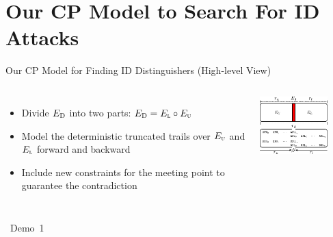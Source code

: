 \documentclass[table,aspectratio=169]{beamer}
\newcommand{\Up}{_{\textsc{u}}} %
\newcommand{\Low}{_{\textsc{l}}} %
\begin{document}
\section{Our CP Model to Search For ID Attacks}

\begin{frame}{Our CP Model for Finding ID Distinguishers (High-level View)}
\begin{columns}[onlytextwidth]
\begin{itemize}
  \item Divide $E_{\textsc{D}}$ into two parts: $E_{\textsc{D}} = E\Low \circ E\Up$
  \item Model the deterministic truncated trails over $E\Up$ and $E\Low$ forward and backward
  \item \textcolor{tugred}{Include new constraints for the meeting point to guarantee the contradiction}
\end{itemize}
\begin{center}
\includegraphics[width=0.75\textwidth]{./figures/miss_in_the_middle.pdf}
\end{center}
\end{columns}
\end{frame}

\begin{frame}
\begin{center}
\vspace{2.5cm}
{\huge \faLaptop~Demo~1}
\end{center}
\end{frame}
\end{document}
